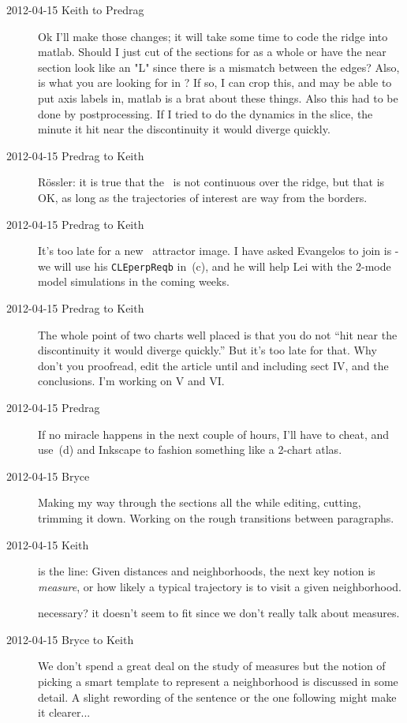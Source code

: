 \begin{description}
\item[2012-04-15 Keith to Predrag]  Ok I'll make those changes; it will
take some time to code the ridge into matlab. Should I just cut of the
sections for as a whole or have the near section look like an "L" since
there is a mismatch between the edges?  Also, is
 what you are looking for in
?  If so, I can crop this, and may be able to put
axis labels in, matlab is a brat about these things. Also this had to be
done by postprocessing.  If I tried to do the dynamics in the slice, the
minute it hit near the discontinuity it would diverge quickly.

\item[2012-04-15 Predrag to Keith] R\"ossler: it is true that the
\PoincBord\ is not continuous over the ridge, but that is OK, as long as
the trajectories of interest are way from the borders.

\item[2012-04-15 Predrag to Keith] It's too late for a new \cLe\
attractor image. I have asked Evangelos to join is - we will use his
\texttt{CLEperpReqb} in \reffig{fig:CLf01group}\,(c), and he will help
Lei with the 2-mode model simulations in the coming weeks.


\item[2012-04-15 Predrag to Keith] The whole point of two charts well
placed is that you do not ``hit near the discontinuity it would diverge
quickly.'' But it's too late for that. Why don't you proofread, edit the
article until and including sect IV, and the conclusions. I'm working on
V and VI.

\item[2012-04-15 Predrag] If no miracle happens in the next couple of
hours, I'll have to cheat, and use \reffig{fig:CLf01group}\,(d) and
Inkscape to fashion something like a 2-chart atlas.

\item[2012-04-15 Bryce] Making my way through the sections all the while
editing, cutting, trimming it down. Working on the rough transitions
between paragraphs.

\item[2012-04-15 Keith] is the line:
Given distances and neighborhoods,
the next key notion is  \emph{measure}, or how likely a typical
trajectory is to visit a given neighborhood.

necessary? it doesn't seem to fit since we don't really talk about measures.

\item[2012-04-15 Bryce to Keith] We don't spend a great deal on the study
of measures but the notion of picking a smart template to represent a
neighborhood is discussed in some detail. A slight rewording of the
sentence or the one following might make it clearer...


\end{description}
